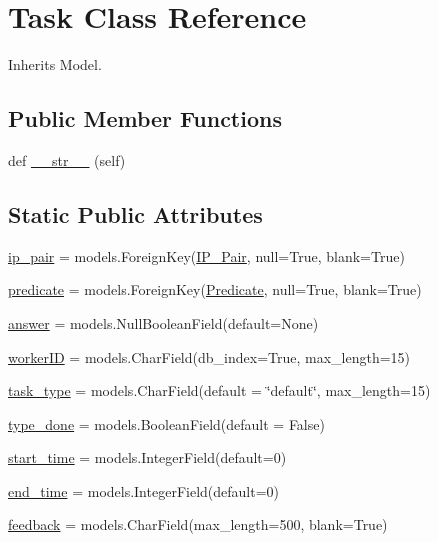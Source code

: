 \hypertarget{classdynamicfilterapp_1_1models_1_1_task}{}\section{Task Class Reference}
\label{classdynamicfilterapp_1_1models_1_1_task}


Inherits Model.

\subsection*{Public Member Functions}
\begin{DoxyCompactItemize}
\item 
def \hyperlink{classdynamicfilterapp_1_1models_1_1_task_a23e8041ce1015febe4fdace3225714f9}{\+\_\+\+\_\+str\+\_\+\+\_\+} (self)
\end{DoxyCompactItemize}
\subsection*{Static Public Attributes}
\begin{DoxyCompactItemize}
\item 
\hyperlink{classdynamicfilterapp_1_1models_1_1_task_a6a81c84f60e4fc0f40d6812d6f6452c7}{ip\+\_\+pair} = models.\+Foreign\+Key(\hyperlink{classdynamicfilterapp_1_1models_1_1_i_p___pair}{I\+P\+\_\+\+Pair}, null=True, blank=True)
\item 
\hyperlink{classdynamicfilterapp_1_1models_1_1_task_a59edc4e3874fffd0c2a9ef88cddfc0fa}{predicate} = models.\+Foreign\+Key(\hyperlink{classdynamicfilterapp_1_1models_1_1_predicate}{Predicate}, null=True, blank=True)
\item 
\hyperlink{classdynamicfilterapp_1_1models_1_1_task_a8c4d9ee8d4f82d724070b97e70b9c4e5}{answer} = models.\+Null\+Boolean\+Field(default=None)
\item 
\hyperlink{classdynamicfilterapp_1_1models_1_1_task_ab569d6674e112f916cbe81a2304d418f}{worker\+ID} = models.\+Char\+Field(db\+\_\+index=True, max\+\_\+length=15)
\item 
\hyperlink{classdynamicfilterapp_1_1models_1_1_task_ab8d9e3d1f9fdf95a31d7b4ce32768eab}{task\+\_\+type} = models.\+Char\+Field(default = \char`\"{}default\char`\"{}, max\+\_\+length=15)
\item 
\hyperlink{classdynamicfilterapp_1_1models_1_1_task_a47b4d7e0fa28b08ed57f086799b026d2}{type\+\_\+done} = models.\+Boolean\+Field(default = False)
\item 
\hyperlink{classdynamicfilterapp_1_1models_1_1_task_a2530c3908f0179486a4c2255f792e27a}{start\+\_\+time} = models.\+Integer\+Field(default=0)
\item 
\hyperlink{classdynamicfilterapp_1_1models_1_1_task_aa18736cc12f8beb112bd108c5a09ef8d}{end\+\_\+time} = models.\+Integer\+Field(default=0)
\item 
\hyperlink{classdynamicfilterapp_1_1models_1_1_task_aecc50b4643d1ea45de7afe20e729c160}{feedback} = models.\+Char\+Field(max\+\_\+length=500, blank=True)
\end{DoxyCompactItemize}


